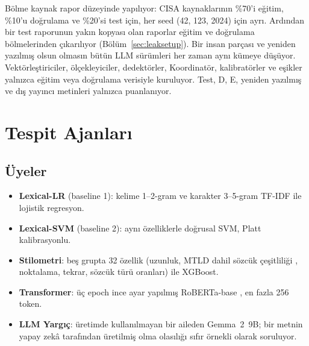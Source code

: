 \documentclass[journal]{IEEEtran}
\begin{document}
Bölme kaynak rapor düzeyinde yapılıyor: CISA kaynaklarının \%70'i eğitim, \%10'u doğrulama ve \%20'si test için, her
seed (42, 123, 2024) için ayrı. Ardından bir test raporunun yakın kopyası olan raporlar eğitim ve doğrulama
bölmelerinden çıkarılıyor (Bölüm~\ref{sec:leaksetup}). Bir insan parçası ve yeniden yazılmış olsun olmasın bütün LLM
sürümleri her zaman aynı kümeye düşüyor. Vektörleştiriciler, ölçekleyiciler, dedektörler, Koordinatör,
kalibratörler ve eşikler yalnızca eğitim veya doğrulama verisiyle kuruluyor. Test, D, E, yeniden yazılmış ve dış
yayıncı metinleri yalnızca puanlanıyor.

\section{Tespit Ajanları}\label{sec:agents}
\subsection{Üyeler}
\begin{itemize}
\item \textbf{Lexical-LR} (baseline 1): kelime 1--2-gram ve karakter 3--5-gram TF-IDF ile lojistik regresyon.
\item \textbf{Lexical-SVM} (baseline 2): aynı özelliklerle doğrusal SVM, Platt kalibrasyonlu.
\item \textbf{Stilometri}: beş grupta 32 özellik (uzunluk, MTLD dahil sözcük çeşitliliği \cite{McCarthy_2010},
noktalama, tekrar, sözcük türü oranları) ile XGBoost.
\item \textbf{Transformer}: üç epoch ince ayar yapılmış RoBERTa-base \cite{Liu_2019}, en fazla 256 token.
\item \textbf{LLM Yargıç}: üretimde kullanılmayan bir aileden Gemma~2~9B; bir metnin yapay zekâ tarafından üretilmiş
olma olasılığı sıfır örnekli olarak soruluyor.
\end{itemize}
\end{document}
